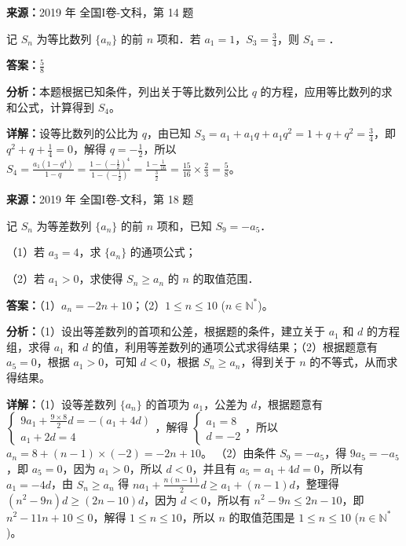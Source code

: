 \begin{question}[points=5]
\textbf{来源：}2019 年 全国I卷-文科，第 14 题\par
记 $S_n$ 为等比数列 $\{a_n\}$ 的前 $n$ 项和．若 $a_1 = 1$，$S_3 = \frac{3}{4}$，则 $S_4 =$．
\fillin[{$\frac{5}{8}$}]
\begin{solution}
\textbf{答案：}$\frac{5}{8}$

\textbf{分析：}本题根据已知条件，列出关于等比数列公比 $q$ 的方程，应用等比数列的求和公式，计算得到 $S_4$。

\textbf{详解：}设等比数列的公比为 $q$，由已知 $S_3 = a_1 + a_1q + a_1q^2 = 1+q+q^2 = \frac{3}{4}$，即 $q^2+q+\frac{1}{4}=0$，解得 $q = -\frac{1}{2}$，所以 $S_4 = \frac{a_1(1-q^4)}{1-q} = \frac{1-(-\frac{1}{2})^4}{1-(-\frac{1}{2})} = \frac{1-\frac{1}{16}}{\frac{3}{2}} = \frac{15}{16} \times \frac{2}{3} = \frac{5}{8}$。
\end{solution}
\end{question}

\begin{question}[points=12]
\textbf{来源：}2019 年 全国I卷-文科，第 18 题\par
记 $S_n$ 为等差数列 $\{a_n\}$ 的前 $n$ 项和，已知 $S_9 = -a_5$．

（1）若 $a_3=4$，求 $\{a_n\}$ 的通项公式；

（2）若 $a_1>0$，求使得 $S_n \ge a_n$ 的 $n$ 的取值范围．
\begin{solution}
\textbf{答案：}（1）$a_n = -2n+10$；（2）$1 \le n \le 10$ ($n \in \mathbb{N}^*$)。

\textbf{分析：}（1）设出等差数列的首项和公差，根据题的条件，建立关于 $a_1$ 和 $d$ 的方程组，求得 $a_1$ 和 $d$ 的值，利用等差数列的通项公式求得结果；（2）根据题意有 $a_5=0$，根据 $a_1>0$，可知 $d<0$，根据 $S_n \ge a_n$，得到关于 $n$ 的不等式，从而求得结果。

\textbf{详解：}（1）设等差数列 $\{a_n\}$ 的首项为 $a_1$，公差为 $d$，根据题意有 $\begin{cases} 9a_1 + \frac{9 \times 8}{2}d = -(a_1+4d) \\ a_1+2d=4 \end{cases}$，解得 $\begin{cases} a_1=8 \\ d=-2 \end{cases}$，所以 $a_n = 8 + (n-1) \times (-2) = -2n+10$。
（2）由条件 $S_9 = -a_5$，得 $9a_5 = -a_5$，即 $a_5=0$，因为 $a_1>0$，所以 $d<0$，并且有 $a_5=a_1+4d=0$，所以有 $a_1=-4d$，由 $S_n \ge a_n$ 得 $na_1+\frac{n(n-1)}{2}d \ge a_1+(n-1)d$，整理得 $(n^2-9n)d \ge (2n-10)d$，因为 $d<0$，所以有 $n^2-9n \le 2n-10$，即 $n^2-11n+10 \le 0$，解得 $1 \le n \le 10$，所以 $n$ 的取值范围是 $1 \le n \le 10$ ($n \in \mathbb{N}^*$)。
\end{solution}
\end{question}

